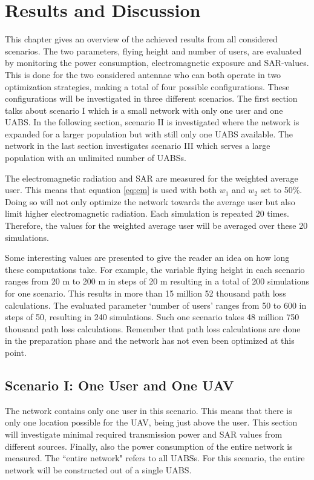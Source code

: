 \chapter{Results and Discussion}
\label{chap:results}

This chapter gives an overview of the achieved results from all considered scenarios. The two parameters,
flying height and number of users, are evaluated by monitoring the power consumption, electromagnetic exposure and \gls{SAR}-values.
This is done for the two considered antennae who can both operate in two optimization strategies, making a total of four possible configurations.
These configurations will be investigated in three different scenarios.
The first section talks about scenario I which is a small network with only one user and one \gls{UABS}. In 
the following section, scenario II is investigated where the network is expanded for a larger population 
but with still only one \gls{UABS} available.
The network in the last section investigates scenario III which serves a large population with an unlimited number of \gls{UABS}s.

The electromagnetic radiation and \gls{SAR} are 
measured for the weighted average user. This means that 
equation \ref{eq:em} is used with both $w_{1}$ and $w_{2}$ set to 50\%. Doing so will not only optimize the network 
towards the average user but also limit higher electromagnetic radiation. Each simulation is repeated 20 times. 
Therefore, the values for the weighted average user will be averaged over these 20 simulations.

Some interesting values are presented to give the reader an idea on how long these computations take.
For example, the variable flying height in each scenario ranges from 
20 m to 200 m in steps of 20 m resulting in a total of 200 simulations for one scenario. 
This results in more than 15 million 52 thousand path loss calculations.
The evaluated parameter  `number of users'
ranges from 50 to 600 in steps of 50, resulting 
in 240 simulations. Such one scenario takes 48 million 750 thousand path loss calculations. Remember that path loss calculations
are done in the preparation phase and the network has not even been optimized at this point.

\section{Scenario I: One User and One \gls{UAV}}
The network contains only one user in this scenario. This means that there is only one location possible for the \gls{UAV},
being just above 
the user. This section will investigate minimal required transmission power and SAR values from different sources.
Finally, also the power consumption of the entire network is measured. The  ``entire network" refers to all \gls{UABS}s. 
For this scenario, the entire network 
will be constructed out of a single \gls{UABS}.

